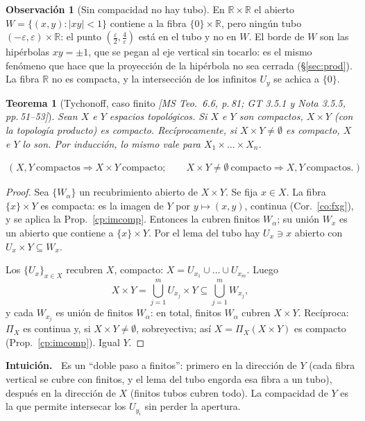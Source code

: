 \documentclass[11pt,a4paper]{article}
\newenvironment{intuicion}{\begin{cajaint}\small\textbf{Intuición.\ }}{\end{cajaint}}
\newcommand{\lgc}[1]{\par\vspace{-3pt}\begin{gather*}\big(\;#1\;\big)\end{gather*}\vspace{-6pt}}
\theoremstyle{definition}
\newtheorem{observacion}[definicion]{Observación}
\theoremstyle{plain}
\newtheorem{teorema}[definicion]{Teorema}
\newcommand{\fnt}[1]{{\normalfont\small\itshape\color{gray!150!black}[#1]}}
\newcommand{\R}{\mathbb{R}}
\begin{document}
\begin{observacion}[Sin compacidad no hay tubo]
En $\R\times\R$ el abierto $W=\{(x,y): |xy|<1\}$ contiene a la fibra $\{0\}\times\R$, pero ningún tubo $(-\varepsilon,\varepsilon)\times\R$: el punto $(\tfrac\varepsilon2,\tfrac4\varepsilon)$ está en el tubo y no en $W$. El borde de $W$ son las hipérbolas $xy=\pm1$, que se pegan al eje vertical sin tocarlo: es el mismo fenómeno que hace que la proyección de la hipérbola no sea cerrada (\S\ref{sec:prod}). La fibra $\R$ no es compacta, y la intersección de los infinitos $U_y$ se achica a $\{0\}$.
\end{observacion}

\begin{teorema}[Tychonoff, caso finito \fnt{MS Teo.\ 6.6, p.\,81; GT 3.5.1 y Nota 3.5.5, pp.\,51--53}]\label{cp:tych}
Sean $X$ e $Y$ espacios topológicos. Si $X$ e $Y$ son compactos, $X\times Y$ (con la topología producto) es compacto. Recíprocamente, si $X\times Y\ne\emptyset$ es compacto, $X$ e $Y$ lo son. Por inducción, lo mismo vale para $X_1\times\dots\times X_n$.
\lgc{X,Y\ \text{compactos}\Rightarrow X\times Y\ \text{compacto};\qquad X\times Y\ne\emptyset\ \text{compacto}\Rightarrow X,Y\ \text{compactos}.}
\end{teorema}

\begin{proof}
Sea $\{W_\alpha\}$ un recubrimiento abierto de $X\times Y$. Se fija $x\in X$. La fibra $\{x\}\times Y$ es compacta: es la imagen de $Y$ por $y\mapsto(x,y)$, continua (Cor.~\ref{co:fxg}), y se aplica la Prop.~\ref{cp:imcomp}. Entonces la cubren finitos $W_\alpha$; su unión $W_x$ es un abierto que contiene a $\{x\}\times Y$. Por el lema del tubo hay $U_x\ni x$ abierto con $U_x\times Y\subseteq W_x$.

Los $\{U_x\}_{x\in X}$ recubren $X$, compacto: $X=U_{x_1}\cup\dots\cup U_{x_m}$. Luego
\[
X\times Y=\textstyle\bigcup_{j=1}^m U_{x_j}\times Y\subseteq\bigcup_{j=1}^m W_{x_j},
\]
y cada $W_{x_j}$ es unión de finitos $W_\alpha$: en total, finitos $W_\alpha$ cubren $X\times Y$.
Recíproca: $\Pi_X$ es continua y, si $X\times Y\ne\emptyset$, sobreyectiva; así $X=\Pi_X(X\times Y)$ es compacto (Prop.~\ref{cp:imcomp}). Igual $Y$.
\end{proof}

\begin{intuicion}
Es un ``doble paso a finitos'': primero en la dirección de $Y$ (cada fibra vertical se cubre con finitos, y el lema del tubo engorda esa fibra a un tubo), después en la dirección de $X$ (finitos tubos cubren todo). La compacidad de $Y$ es la que permite intersecar los $U_{y_i}$ sin perder la apertura.
\end{intuicion}
\end{document}
